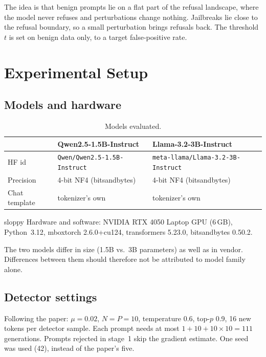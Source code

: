 \documentclass[11pt,a4paper]{article}
\newcommand{\code}[1]{\texttt{#1}}
\begin{document}
The idea is that benign prompts lie on a flat part of the refusal landscape, where the model never refuses and perturbations change nothing. Jailbreaks lie close to the refusal boundary, so a small perturbation brings refusals back. The threshold $t$ is set on benign data only, to a target false-positive rate.

\section{Experimental Setup}

\subsection{Models and hardware}

\begin{table}[h]
\centering
\caption{Models evaluated.}
\begin{tabular}{lll}
\toprule
 & Qwen2.5-1.5B-Instruct & Llama-3.2-3B-Instruct \\
\midrule
HF id & \code{Qwen/Qwen2.5-1.5B-Instruct} & \code{meta-llama/Llama-3.2-3B-Instruct} \\
Precision & 4-bit NF4 (bitsandbytes) & 4-bit NF4 (bitsandbytes) \\
Chat template & tokenizer's own & tokenizer's own \\
\bottomrule
\end{tabular}
\end{table}

sloppy
Hardware and software: NVIDIA RTX 4050 Laptop GPU (6\,GB), Python~3.12, mbox{torch} 2.6.0+cu124, transformers 5.23.0, bitsandbytes 0.50.2.

The two models differ in size (1.5B vs.\ 3B parameters) as well as in vendor. Differences between them should therefore not be attributed to model family alone.

\subsection{Detector settings}

Following the paper: $\mu = 0.02$, $N = P = 10$, temperature 0.6, top-$p$ 0.9, 16 new tokens per detector sample. Each prompt needs at most $1 + 10 + 10 \times 10 = 111$ generations. Prompts rejected in stage~1 skip the gradient estimate. One seed was used (42), instead of the paper's five.
\end{document}
